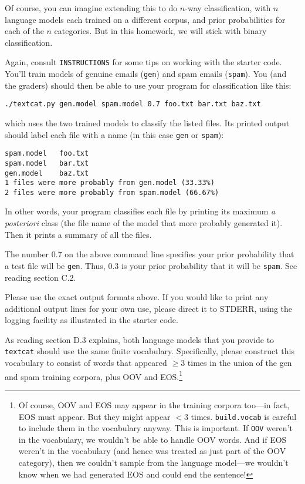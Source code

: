 \documentclass[12pt]{article}
\theoremstyle{plain}
\theoremstyle{definition}
\theoremstyle{remark}
\begin{document}
Of course, you can imagine extending this to do $n$-way classification, with $n$ language models each trained on a different corpus, and prior probabilities for each of the $n$ categories. But in this homework, we will stick with binary classification.

Again, consult \texttt{INSTRUCTIONS} for some tips on working with the starter code. You’ll train models of genuine emails (\texttt{gen}) and spam emails (\texttt{spam}). You (and the graders) should then be able to use your program for classification like this:
\begin{verbatim}
./textcat.py gen.model spam.model 0.7 foo.txt bar.txt baz.txt
\end{verbatim}

which uses the two trained models to classify the listed files. Its printed output should label each file with a name (in this case \texttt{gen} or \texttt{spam}):

\begin{verbatim}
spam.model   foo.txt
spam.model   bar.txt
gen.model    baz.txt
1 files were more probably from gen.model (33.33%)
2 files were more probably from spam.model (66.67%)
\end{verbatim}

In other words, your program classifies each file by printing its maximum \textit{a posteriori} class (the file name of the model that more probably generated it). Then it prints a summary of all the files.

The number 0.7 on the above command line specifies your prior probability that a test file will be \texttt{gen}. Thus, 0.3 is your prior probability that it will be \texttt{spam}. See reading section C.2.

Please use the exact output formats above. If you would like to print any additional output lines for your own use, please direct it to STDERR, using the logging facility as illustrated in the starter code.

As reading section D.3 explains, both language models that you provide to \texttt{textcat} should use the same finite vocabulary. Specifically, please construct this vocabulary to consist of words that appeared $\geq 3$ times in the union of the gen and spam training corpora, plus OOV and EOS.\footnote{Of course, OOV and EOS may appear in the training corpora too—in fact, EOS must appear. But they might appear $<3$ times. \texttt{build.vocab} is careful to include them in the vocabulary anyway. This is important. If \texttt{OOV} weren’t in the vocabulary, we wouldn’t be able to handle OOV words. And if EOS weren’t in the vocabulary (and hence was treated as just part of the OOV category), then we couldn’t sample from the language model—we wouldn’t know when we had generated EOS and could end the sentence!}
\end{document}
